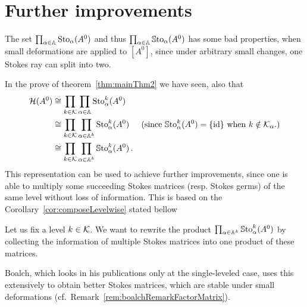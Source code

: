 \section{Further improvements}
The set $\prod_{\alpha\in\mathbb{A}}\operatorname{Sto}_\alpha(A^0)$ and thus
$\prod_{\alpha\in\mathbb{A}}\operatorname{\mathbb{S}to}_\alpha(A^0)$ has some bad properties, when small
deformations are applied to $[A^0]$, since under arbitrary small changes, one
Stokes ray can split into two.
\begin{comment}
  \begin{rem}\label{rem:boalchRemarkFactorMatrix}
    Boalch~\cite{boalch,thboalch}\PROBLEM[solution goes back to
    \cite{BJL1979Birkhoff} or so?] solves this in the single-leveled case by
    \rewrite{renaming our Stokes matrices as Stokes factors} and introducing
    new Stokes matrices which are build by the product of consecutive Stokes
    factors.
  \end{rem}
\end{comment}
In the prove of theorem~\ref{thm:mainThm2} we have seen,  also that
\begin{align*}
  \mathcal{H}(A^0)&\cong\prod_{k\in\mathcal{K}}\prod_{\alpha\in\mathbb{A}}\operatorname{Sto}_\alpha^k(A^0) 
  \\&\cong\prod_{k\in\mathcal{K}}\prod_{\alpha\in\mathbb{A}^k}\operatorname{Sto}_\alpha^k(A^0)
  &\text{(since $\operatorname{\mathbb{S}to}_{\alpha}^{k}(A^0)=\{\operatorname{id}\}$ when $k\notin\mathcal{K}_\alpha$.)}
  \\&\cong\prod_{k\in\mathcal{K}}\prod_{\alpha\in\mathbb{A}^k}\operatorname{\mathbb{S}to}_\alpha^k(A^0) \,.
\end{align*}
This representation can be used to achieve further improvements, since one is
able to multiply some succeeding Stokes matrices (resp. Stokes germs) of the
same level without loss of information.
This is based on the Corollary~\ref{cor:composeLevelwise} stated bellow

Let us fix a level $k\in\mathcal{K}$. We want to rewrite the product
$\prod_{\alpha\in\mathbb{A}^k}\operatorname{\mathbb{S}to}_\alpha^k(A^0)$ by collecting the information of
multiple Stokes matrices into one product of these matrices.

\TODO[move?]
Boalch, which looks in his publications \cite{boalch,thboalch} only at the
single-leveled case, uses this extensively to obtain better Stokes matrices,
which are stable under small deformations
(cf.\ Remark~\ref{rem:boalchRemarkFactorMatrix}).


